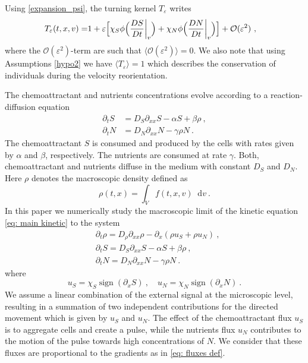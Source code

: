 \documentclass[11pt,twoside]{article}
\DeclareMathOperator{\sign}{sign}
\newcommand*\diff{\mathop{}\!\mathrm{d}}
\begin{document}
 
Using \eqref{expansion_psi}, the turning kernel $T_\varepsilon$ writes
\begin{align}
    T_\varepsilon(t,x,{v})=& 1+\varepsilon\Bigl[\chi_S\phi\Bigl(\frac{DS}{Dt}\bigg\rvert_{v}\Bigr)+ \chi_N\phi\Bigl(\frac{DN}{Dt}\bigg\rvert_{v}\Bigr)\Bigr]  + {\mathcal{O}(\varepsilon^2)} \ ,\label{eq: turning operator scaled}
\end{align}
{where the $\mathcal{O}(\varepsilon^2)$-term {are such that} $\langle\mathcal{O}(\varepsilon^2)\rangle=0$. We also note that using Assumptions \ref{hypo2} we have $\langle T_\varepsilon\rangle=1$ which describes the conservation of individuals during the velocity reorientation.}

The chemoattractant and nutrients concentrations evolve according to a reaction-diffusion equation
\begin{align}
    \partial_t S&=D_S\partial_{xx}S-\alpha S+\beta \rho\ ,\\
    \partial_t N&=D_N\partial_{xx}N-\gamma\rho N\ .
\end{align}
The chemoattractant $S$ is consumed and produced by the cells with rates given by $\alpha$ and $\beta$, respectively. The nutrients are consumed at rate $\gamma$. Both, chemoattractant and nutrients diffuse in the medium with constant $D_S$ and $D_N$. Here $\rho$ denotes the macroscopic density defined as
\[
\rho(t,x)=\int_Vf(t,x,v)\diff v\ .
\]
In this paper we numerically study the macroscopic limit of the kinetic equation \eqref{eq: main kinetic} to the system 
\begin{equation}
\begin{aligned}
&\partial_t\rho =D_\rho\partial_{xx}\rho-\partial_x (\rho u_S+\rho u_N)\ ,\\
&\partial_tS =D_S\partial_{xx} S-\alpha S+\beta \rho\ ,\\
&\partial_t N=D_N\partial_{xx} N-\gamma \rho N\ .\label{eq: macro system}
\end{aligned}
\end{equation}
where
\begin{equation}
u_S= \chi_S\sign(\partial_x S)\ , \quad u_N= \chi_N\sign(\partial_x N)\ .\label{eq: fluxes def}
\end{equation}
 We assume a linear combination of the external signal at the microscopic level, resulting in a summation of two independent contributions for the directed movement which is given by $u_S$ and $u_N$. The effect of the chemoattractant flux $u_S$ is to aggregate cells and create a pulse, while the nutrients flux $u_N$ contributes to the motion of the pulse towards high concentrations of $N$. We consider that these fluxes are proportional to the gradients as in \eqref{eq: fluxes def}.
\end{document}
